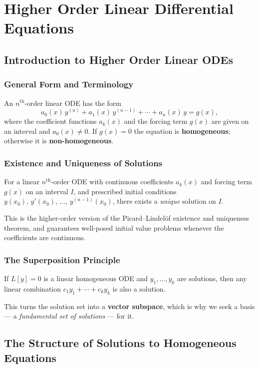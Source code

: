 \documentclass[10pt]{article}
\newcommand{\m}[1]{$#1$}
\begin{document}
\section{Higher Order Linear Differential Equations}

\subsection{Introduction to Higher Order Linear ODEs}

    \subsubsection{General Form and Terminology}
    An \m{n^{\text{th}}}-order linear ODE has the form
    \[
        a_0(x)\,y^{(n)} + a_1(x)\,y^{(n-1)} + \cdots + a_n(x)\,y = g(x),
    \]
    where the coefficient functions \m{a_k(x)} and the forcing term \m{g(x)} are given on an interval
    and \m{a_0(x) \neq 0}.
    If \m{g(x) = 0} the equation is \textbf{homogeneous}; otherwise it is \textbf{non-homogeneous}.

    \subsubsection{Existence and Uniqueness of Solutions}
    For a linear \m{n^{\text{th}}}-order ODE with continuous coefficients \m{a_k(x)} and forcing term
    \m{g(x)} on an interval \m{I}, and prescribed initial conditions
    \m{y(x_0),\, y'(x_0),\, \ldots,\, y^{(n-1)}(x_0)}, there exists a \emph{unique} solution on \m{I}.

    This is the higher-order version of the Picard--Lindel\"{o}f existence and uniqueness theorem, and
    guarantees well-posed initial value problems whenever the coefficients are continuous.

    \subsubsection{The Superposition Principle}
    If \m{L[y] = 0} is a linear homogeneous ODE and \m{y_1, \ldots, y_k} are solutions, then any linear
    combination \m{c_1 y_1 + \cdots + c_k y_k} is also a solution.

    This turns the solution set into a \textbf{vector subspace}, which is why we seek a basis --- a
    \emph{fundamental set of solutions} --- for it.

\subsection{The Structure of Solutions to Homogeneous Equations}
\end{document}
